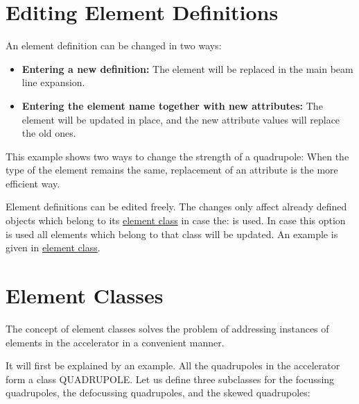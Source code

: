 %
\section{Editing Element Definitions}  
\label{sec:element-editing}

An element definition can be changed in two ways: 
\begin{itemize}
   \item \textbf{Entering a new definition:} The element will be
     replaced in the main beam line expansion.  
   \item \textbf{Entering the element name together with new
     attributes:} The element will be updated in place, and the new
     attribute values will replace the old ones.  
\end{itemize} 

This example shows two ways to change the strength of a quadrupole: 
When the type of the element remains the same, replacement of an
attribute is the more efficient way.  

Element definitions can be edited freely. The changes only affect
already defined objects which belong to its
\hyperref[sec:element-classes]{element class} in case the:  is used. 
In case this option is used all elements which belong to that class will be updated. 
An example is given in \hyperref[sec:element-classes]{element class}.   


%
\section{Element Classes}  
\label{sec:element-classes}
The concept of element classes solves the problem of addressing
instances of elements in the accelerator in a convenient manner. 

It will first be explained by an example. All the quadrupoles in the
accelerator form a class QUADRUPOLE. Let us define three subclasses for the
focussing quadrupoles, the defocussing quadrupoles, and the skewed
quadrupoles:  

